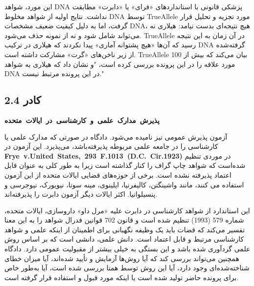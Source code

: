این مورد، شواهد DNA پزشکی قانونی با استانداردهای «فرای» یا «دابرت» مطابقت نداشت.
نتایج اولیه از شواهد مخلوط DNA توسط TrueAllele مورد تجزیه و تحلیل قرار گرفت، اما به دلیل کیفیت ضعیف مشخصات DNA، هیچ نتیجه‌ای بدست نیامد: هیلاری نه می‌تواند شامل شود و نه از نمونه حذف می‌شود.
TrueAllele در آن زمان به این نتیجه رسید که آن‌ها «هیچ پشتوانه آماری» پیدا نکردند که هیلاری در ترکیب DNA گرفته‌شده از زیر ناخن‌های «گرت» مشارکت داشته است.
TrueAllele بیان می‌کند که بیش از 100 مورد علاقه را در این پرونده بررسی کرده است، "و نشان داد که هیلاری به شواهد DNA در این پرونده مرتبط نیست."



\begin{tcolorbox}[colback=gray!10,colframe=black,breakable]

    \section*{کادر 2.4}
    \label{sec:کادر 2.4}
    \begin{Large}
        \textbf{\mbox{پذیرش مدارک علمی و کارشناسی در ایالات متحده}}
    \end{Large}
    \newline

    \begin{description}[leftmargin=0.5cm,style=nextline]
        \item[آزمون فرای:] آزمون پذیرش عمومی نیز نامیده می‌شود.
        دادگاه در صورتی که مدارک علمی یا کارشناسی را در جامعه علمی مربوطه پذیرفته‌باشد، می‌پذیرد.
        این آزمون در \textenglish{\mbox{\textbf{Frye v.United States, 293 F.1013 (D.C. Cir.1923)}}}  در موردی تنظیم شده‌است که شواهد چاپ گراف را کنار گذاشته است زیرا به طور کلی به عنوان قابل اعتماد پذیرفته نشده است.
        برخی از حوزه‌های قضایی ایالات متحده از این آزمون استفاده می کنند، مانند واشینگتن، کالیفرنیا، ایلینوی، مینه سوتا، نیویورک، نیوجرسی و پنسیلوانیا.
        اکثر ایالات دیگر آزمون دابرت را پذیرفته‌اند.

        \item[آزمون دابرت:] این استاندارد از شواهد کارشناسی در دابرت علیه «مرل داو» داروسازی، ایالات متحده، شماره 579 (1993) تنظیم شده است و قانون 702 قوانین فدرال شواهد را به این معنا تفسیر می‌کند که قضات باید یک وظیفه نگهبانی برای اطمینان از اینکه علمی و شواهد کارشناسی مرتبط و قابل اعتماد است.
        دانش علمی، دانشی است که بر اساس روش علمی گردآوری شده باشد و این بستگی به خیلی بیشتر از مقبولیت عمومی دارد.
        دادگاه همچنین می‌تواند بررسی کند که آیا روش‌ها آزمایش و تأیید شده‌اند، آیا میزان خطای شناخته‌شده‌ای وجود دارد، آیا این روش توسط همتا بررسی شده است، آیا به‌طور خاص برای پرونده حاضر تولید شده است یا اینکه مورد قبول و استفاده قرار گرفته است.
    \end{description}


\end{tcolorbox}
